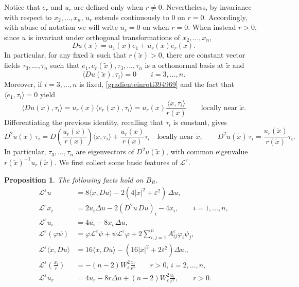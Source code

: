 \documentclass[11pt]{amsart}
\renewcommand{\ge}{>}
\newcommand{\eps}{\varepsilon}
\newcommand{\Le}{\mathcal L^\eps}
\newcommand{\Ae}{A^\eps}
\newtheorem{proposition}[theorem]{Proposition}
\theoremstyle{definition}
\theoremstyle{remark}
\numberwithin{equation}{section}
\begin{document}
Notice that $e_r$ and $u_r$ are defined only when $r\neq 0$. Nevertheless, by invariance with respect to $x_2,\ldots,x_n$, $u_r$ extends continuously to $0$ on $r=0$. Accordingly, with abuse of notation we will write $u_r=0$ on when $r=0$. When instead $r\ge 0$, since $u$ is invariant under orthogonal transformations of $x_2,\ldots,x_n$,
\begin{equation}\label{gradienteinroti394969}
    Du(x)=u_1(x) e_1+u_r(x)e_r(x).
\end{equation}
In particular, for any fixed $\tilde x$ such that $r(\tilde x)\ge 0$, there are constant vector fields $\tau_3,\ldots,\tau_n$ such that $e_1,e_r(\tilde x),\tau_3,\ldots,\tau_n$ is a orthonormal basis at $\tilde x$ and 
\begin{equation}\label{campiortogonali384956995}
    \langle Du(\tilde x),\tau_i\rangle=0\qquad i=3,\ldots,n. 
\end{equation}
Moreover, if $i=3,\ldots,n$ is fixed,  \eqref{gradienteinroti394969} and the fact that $\langle e_1,\tau_i\rangle =0$ yield
\begin{equation*}
    \langle Du(x),\tau_i\rangle =u_r(x)\langle e_r(x),\tau_i\rangle=u_r(x)\frac{\langle x,\tau_i\rangle}{r(x)}\qquad \text{locally near $\tilde x$}.
\end{equation*}
Differentiating the previous identity, recalling that $\tau_i$ is constant, gives
\begin{equation}\label{eigenvectorsipreliminaries394596}
    D^2u(x)\,\tau_i =D\left(\frac{u_r(x)}{r(x)}\right) \langle x,\tau_i\rangle+\frac{u_r(x)}{r(x)}\tau_i\quad \text{locally near $\tilde x$},\qquad  D^2 u(\tilde x)\,\tau _i=\frac{u_r(\tilde x)}{r(\tilde x)}\tau_i.
\end{equation}
In particular, $\tau_3,\ldots,\tau_n$ are eigenvectors of $D^2 u(\tilde x)$, with common eigenvalue $r(\tilde x)^{-1}u_r(\tilde x)$. We first collect some basic features of $\Le$. 
\begin{proposition}
    The following facts hold on $B_R$.
    \begin{align}
    \Le u&=8\langle x, Du\rangle -2(4|x|^2+\eps^2)\,\Delta u,\label{prole1}\\
    \Le x_i&=2 u_i\Delta u-2(D^2 u\,Du)_i-4x_i,\qquad i=1,\ldots,n,\label{prole2}\\
    \Le u_i&=4u_i-8x_i\,\Delta u,\label{prole3}\\
    \Le(\varphi\psi)&=\varphi\Le \psi+\psi\Le\varphi+2\sum_{i,j=1}^n\Ae_{ij}\varphi_i\psi_j,\label{prole4}\\
   \Le\langle x,Du\rangle&=16\langle x,Du\rangle-(16|x|^2+2\varepsilon^2)\Delta u.\label{prole5},\\
\Le\left(\frac{x_i}{r}\right)
&=-(n-2)W_\varepsilon^2\frac{x_i}{r^3}
\qquad r>0,\,i=2,\ldots,n,\label{prole6}\\
\Le u_r
&=
4u_r-8r\Delta u
+(n-2)W_\varepsilon^2\frac{u_r}{r^2},\qquad r>0.\label{prole7}
    \end{align}
\end{proposition}
\end{document}
